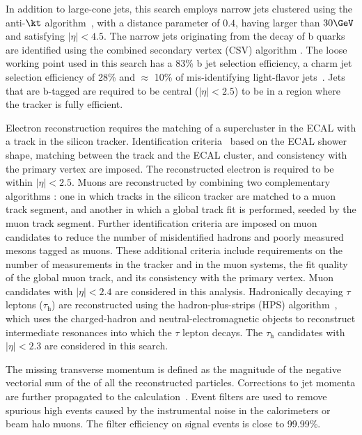 In addition to large-cone jets, this search employs narrow jets clustered using the anti-$\kt$ algorithm~\cite{Cacciari:2008gp}, with a distance parameter of $0.4$, having \pt larger than $30\GeV$ and satisfying $|\eta|<4.5$. The narrow jets originating from the decay of b quarks are identified using the combined secondary vertex (CSV) algorithm \cite{BTV-15-001, BTV-paper-2012-001}. The loose working point used in this search has a 83\% b jet selection efficiency, a charm jet selection efficiency of 28\% and $\approx$ 10\% of mis-identifying light-flavor jets~\cite{BTV-15-001}. Jets that are b-tagged are required to be central ($|\eta|<2.5$) to be in a region where the tracker is fully efficient.

Electron reconstruction requires the matching of a supercluster in the ECAL with a track in the silicon tracker.
Identification criteria~\cite{Khachatryan:2015hwa} based on the ECAL shower shape, matching between the track and the ECAL cluster, and consistency with the primary vertex are imposed. The reconstructed electron is required to be within $|\eta|< 2.5$. Muons are reconstructed by combining two complementary algorithms \cite{CMSMuonJINST}:
 one in which tracks in the silicon tracker are matched to a muon track segment, and another in which a global track fit is performed, seeded by the muon track segment.  
Further identification criteria are imposed on muon candidates to reduce the number of misidentified hadrons and poorly measured mesons tagged as muons. 
These additional criteria include requirements on the number of measurements in the tracker and in the muon systems, the fit quality of the global muon track, and its consistency with the primary vertex.
Muon candidates with $|\eta|< 2.4$ are considered in this analysis. 
Hadronically decaying $\tau$ leptons ($\tau_\mathrm{h}$) are reconstructed using the hadron-plus-strips
 (HPS) algorithm~\cite{CMSTauJINST}, which uses the charged-hadron and neutral-electromagnetic objects 
to reconstruct intermediate resonances into which the $\tau$ lepton decays. The $\tau_\mathrm{h}$ 
candidates with $|\eta|< 2.3$ are considered in this search. %

The missing transverse momentum \MET is defined as the magnitude of the negative vectorial sum of the \pt of all the reconstructed particles. Corrections to jet momenta are further propagated to the \MET calculation~\cite{CMS-PAS-JME-16-004}. Event filters \cite{CMS-PAS-JME-16-004} are used to remove spurious high \MET events caused by the instrumental noise in the calorimeters or beam halo muons. The filter efficiency on signal events is close to 99.99\%.

